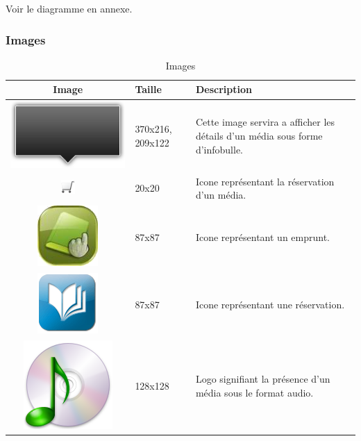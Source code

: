 \documentclass[letter, 11pt]{report}
\begin{document}
Voir le diagramme en annexe.

\subsubsection{Images}

\begin{table}[h!tbp]
	\caption{Images}
	\begin{center}
		\begin{tabular}{|c|l|p{10cm}|}
		\hline
		Image                                            & Taille           & Description \\ \hline
		\includegraphics[scale=0.2]{black_arrow_big.png} & 370x216, 209x122 & Cette image servira a afficher les détails d'un média sous forme d'infobulle.\\ \hline
		\includegraphics{cart.png}                       & 20x20            & Icone représentant la réservation d'un média. \\ \hline
		\includegraphics[scale=1.15]{emprunt.png}        & 87x87            & Icone représentant un emprunt. \\ \hline
		\includegraphics[scale=0.3]{reservation.png}     & 87x87            & Icone représentant une réservation. \\ \hline
		\includegraphics[scale=0.3]{audio.png}           & 128x128          & Logo signifiant la présence d'un média sous le format audio. \\ \hline

\end{tabular}
\end{center}
\end{table}
\end{document}
